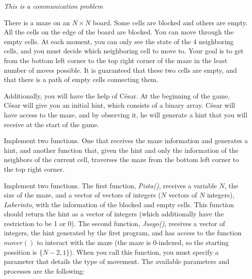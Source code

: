 \documentclass[12pt]{scrartcl}
\begin{document}
    
    {\itshape This is a communication problem}
    
    \vspace{10pt}

    There is a maze on an $N \times N$ board. Some cells are blocked and others are empty. All the cells on the edge of the board are blocked. You can move through the empty cells. At each moment, you can only see the state of the 4 neighboring cells, and you must decide which neighboring cell to move to. Your goal is to get from the bottom left corner to the top right corner of the maze in the least number of moves possible. It is guaranteed that these two cells are empty, and that there is a path of empty cells connecting them.

    Additionally, you will have the help of César. At the beginning of the game, César will give you an initial hint, which consists of a binary array. César will have access to the maze, and by observing it, he will generate a hint that you will receive at the start of the game.

    
    Implement two functions. One that receives the maze information and generates a hint, and another function that, given the hint and only the information of the neighbors of the current cell, traverses the maze from the bottom left corner to the top right corner.


    Implement two functions. The first function, \textit{Pista()}, receives a variable $N$, the size of the maze, and a vector of vectors of integers ($N$ vectors of $N$ integers), \textit{Laberinto}, with the information of the blocked and empty cells. This function should return the hint as a vector of integers (which additionally have the restriction to be 1 or 0). The second function, \textit{Juego()}, receives a vector of integers, the hint generated by the first program, and has access to the function $mover()$ to interact with the maze (the maze is 0-indexed, so the starting possition is $\{N - 2, 1\}$). When you call this function, you must specify a parameter that details the type of movement. The available parameters and processes are the following:
\end{document}
